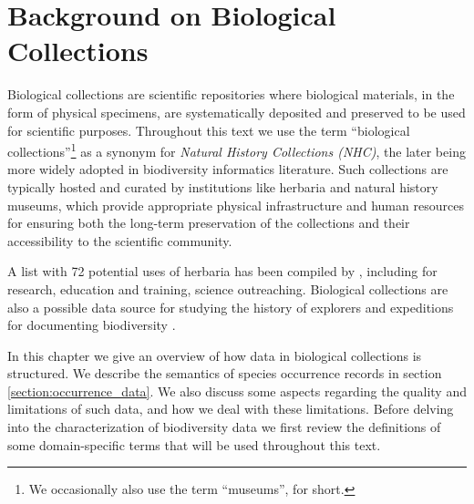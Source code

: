 \chapter{Background on Biological Collections}\label{biodiversity_data}



Biological collections are scientific repositories where biological materials, in the form of physical specimens, are systematically deposited and preserved to be used for scientific purposes. 
Throughout this text we use the term ``biological collections''\footnote{We occasionally also use the term ``museums'', for short.} as a synonym for \textit{Natural History Collections (NHC)}, the later being more widely adopted in biodiversity informatics literature.
Such collections are typically hosted and curated by institutions like herbaria and natural history museums, which provide appropriate physical infrastructure and human resources for ensuring both the long-term preservation of the collections and their accessibility to the scientific community.

A list with 72 potential uses of herbaria has been compiled by , including for research, education and training, science outreaching.
Biological collections are also a possible data source for studying the history of explorers and expeditions for documenting biodiversity \cite{Funk2004}. 




In this chapter we give an overview of how data in biological collections is structured.
We describe the semantics of species occurrence records in section \ref{section:occurrence_data}.
We also discuss some aspects regarding the quality and limitations of such data, and how we deal with these limitations.
Before delving into the characterization of biodiversity data we first review the definitions of some domain-specific terms that will be used throughout this text. 

